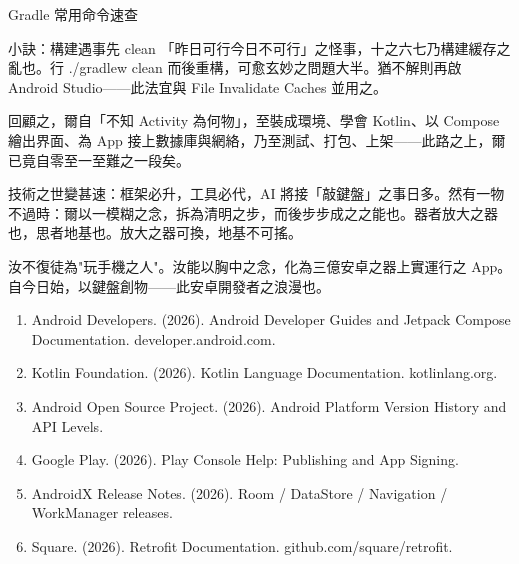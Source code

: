 \begin{center}\small\color{gray}Gradle 常用命令速查\end{center}

\begin{tcbinfo}{小訣：構建遇事先 clean}
「昨日可行今日不可行」之怪事，十之六七乃構建緩存之亂也。行 ./gradlew clean 而後重構，可愈玄妙之問題大半。猶不解則再啟 Android Studio——此法宜與 File Invalidate Caches 並用之。

\end{tcbinfo}



回顧之，爾自「不知 Activity 為何物」，至裝成環境、學會 Kotlin、以 Compose 繪出界面、為 App 接上數據庫與網絡，乃至測試、打包、上架——此路之上，爾已竟自零至一至難之一段矣。

技術之世變甚速：框架必升，工具必代，AI 將接「敲鍵盤」之事日多。然有一物不過時：爾以一模糊之念，拆為清明之步，而後步步成之之能也。器者放大之器也，思者地基也。放大之器可換，地基不可搖。

汝不復徒為"玩手機之人"。汝能以胸中之念，化為三億安卓之器上實運行之 App。自今日始，以鍵盤創物——此安卓開發者之浪漫也。


\begin{enumerate}
  \item Android Developers. (2026). Android Developer Guides and Jetpack Compose Documentation. developer.android.com.
  \item Kotlin Foundation. (2026). Kotlin Language Documentation. kotlinlang.org.
  \item Android Open Source Project. (2026). Android Platform Version History and API Levels.
  \item Google Play. (2026). Play Console Help: Publishing and App Signing.
  \item AndroidX Release Notes. (2026). Room / DataStore / Navigation / WorkManager releases.
  \item Square. (2026). Retrofit Documentation. github.com/square/retrofit.
\end{enumerate}
